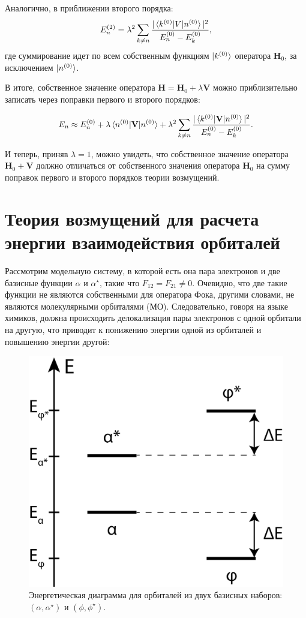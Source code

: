 \documentclass{article}
\begin{document}
Аналогично, в приближении второго порядка:
\begin{equation}
    E_n^{(2)} = \lambda^2 \sum_{k \neq n} \frac{|\braket{k^{(0)}|V|n^{(0)}}|^2}{E_n^{(0)} - E_k^{(0)}},
\end{equation}
где суммирование идет по всем собственным функциям $\ket{k^{(0)}}$ оператора $\textbf{H}_0$, за исключением $\ket{n^{(0)}}$.

В итоге, собственное значение оператора $\textbf{H} = \textbf{H}_0 + \lambda \textbf{V}$ можно приблизительно записать через поправки первого и второго порядков:

\begin{equation}
    E_n \approx E_n^{(0)} + \lambda \braket{n^{(0)}|\textbf{V}|n^{(0)}} + \lambda^2 \sum_{k \neq n} \frac{|\braket{k^{(0)}|\textbf{V}|n^{(0)}}|^2}{E_n^{(0)} - E_k^{(0)}}.
\end{equation}

И теперь, приняв $\lambda = 1$, можно увидеть, что собственное значение оператора $\textbf{H}_0 + \textbf{V}$ должно отличаться от собственного значения оператора $\textbf{H}_0$ на сумму поправок первого и второго порядков теории возмущений.


\section{Теория возмущений для расчета энергии взаимодействия орбиталей}

Рассмотрим модельную систему, в которой есть она пара электронов и две базисные функции $\alpha$ и $\alpha^\star$, такие что $F_{12} = F_{21} \neq 0$. Очевидно, что две такие функции не являются собственными для оператора Фока, другими словами, не являются молекулярными орбиталями (МО). Следовательно, говоря на языке химиков, должна происходить делокализация пары электронов с одной орбитали на другую, что приводит к понижению энергии одной из орбиталей и повышению энергии другой: 

\begin{figure}[h]
\centering
\captionsetup{justification=centering}
\includegraphics[width=0.5\linewidth]{Fig1.png}
\caption{Энергетическая диаграмма для орбиталей из двух базисных наборов: $(\alpha, \alpha^{\star})$ и $(\phi, \phi^{\star})$.}
\label{fig:fig1}
\end{figure}
\end{document}

